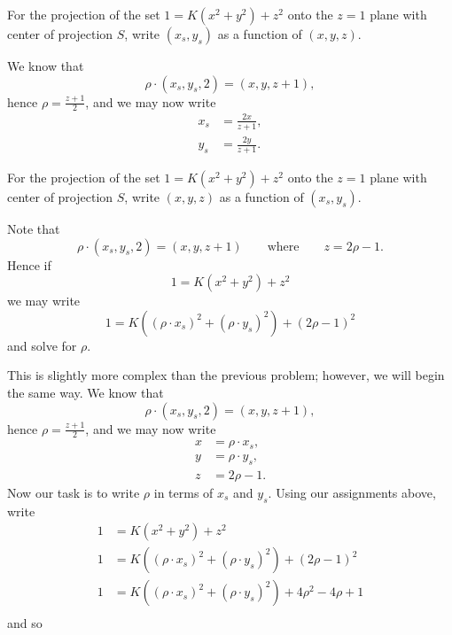 \documentclass[newpage,hints,handout]{ximera}
\begin{document}
\begin{problem}
  For the projection of the set $1=K\left(x^{2}+y^{2}\right)+z^{2}$
  onto the $z=1$ plane with center of projection $S$, write
  $(x_{s},y_{s})$ as a function of $(x,y,z)$.
  \begin{freeResponse}
    We know that
    \[
    \rho\cdot(x_{s},y_{s},2)=(x,y,z+1),
    \]
    hence $\rho=\frac{z+1}{2}$, and we may now write
    \begin{align*}
      x_{s} &=\frac{2x}{z+1},\\
      y_{s} &=\frac{2y}{z+1}.
    \end{align*}
  \end{freeResponse}
\end{problem}

\begin{problem}
  For the projection of the set $1=K\left(x^{2}+y^{2}\right)+z^{2}$
  onto the $z=1$ plane with center of projection $S$, write
  $(x,y,z)$ as a function of $(x_s,y_s)$.
  \begin{hint}
    Note that
      \[
      \rho\cdot(x_{s},y_{s},2)=(x,y,z+1) \qquad\text{where}\qquad z = 2\rho-1.
      \]
    Hence if
    \[
    1 = K\left(x^2 + y^2\right) + z^2
    \]
    we may write
    \[
    1 = K\left((\rho\cdot x_s)^2 + (\rho\cdot y_s)^2\right) + (2\rho-1)^2
    \]
    and solve for $\rho$.
  \end{hint}
  \begin{freeResponse}
    This is slightly more complex than the previous problem; however,
    we will begin the same way. We know that
    \[
    \rho\cdot(x_{s},y_{s},2)=(x,y,z+1),
    \]
    hence $\rho=\frac{z+1}{2}$, and we may now write
    \begin{align*}
      x &= \rho \cdot x_s,\\
      y &= \rho \cdot y_s,\\
      z &= 2\rho-1.
    \end{align*}
    Now our task is to write $\rho$ in terms of $x_s$ and
    $y_s$. Using our assignments above, write
    \begin{align*}
      1 &= K\left(x^2 + y^2\right) + z^2\\
      1 &= K\left((\rho\cdot x_s)^2 + (\rho\cdot y_s)^2\right) + (2\rho-1)^2\\
      1 &= K\left((\rho\cdot x_s)^2 + (\rho\cdot y_s)^2\right) + 4\rho^2-4\rho + 1\\
    \end{align*}
    and so
    \begin{align*}

\end{align*}
\end{freeResponse}
\end{problem}
\end{document}
